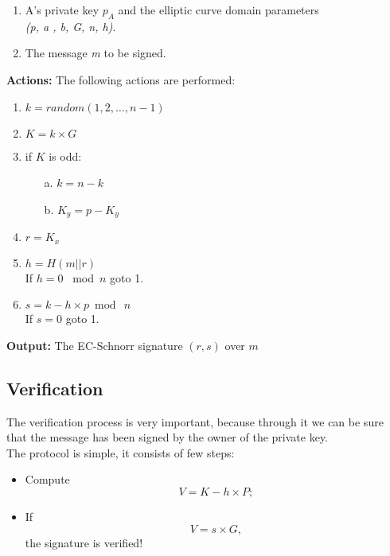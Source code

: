 \hspace{1.1cm}
\begin{minipage}[l]{2\linewidth}
\begin{enumerate}
	\item A's private key  \textit{$p_{A}$} and the elliptic curve domain parameters\\ \textit{(p, a , b, G, n, h)}.
	\item The message \textit{m} to be signed.\\
\end{enumerate}
\end{minipage}


\textbf{Actions:} The following actions are performed:

\hspace{1.2cm}
\begin{minipage}[l]{2\linewidth}
	\begin{enumerate}
		\item $\textit{k}=random({1, 2, \dots, n-1})$
		\item $K=k \times G$
		\item if $K$ is odd:
		\begin{itemize}
		      \item[a.] $k=n-k$
		      \item[b.] $K_{y}=p-K_{y}$
		\end{itemize}
		\item $r=K_{x}$
		\item $h=H(m||r)$\\
		If $h=0$ \ mod\ $n$ goto 1.
		\item $s=k - h \times p \bmod\ n$ \\
		If $s=0$ goto 1.
	\end{enumerate}
\end{minipage}

\textbf{Output:} The EC-Schnorr signature $(r, s)$ over $m$


\subsection{Verification}
The verification process is very important, because through it we can be sure that the message has been signed by the owner of the private key.\\
The protocol is simple, it consists of few steps:
\begin{itemize}
	\item Compute
	\begin{equation}
	\label{eqn:verif1}
	 V = K - h \times P;
	 \end{equation}
	\item If 
	\begin{equation}
	\label{eqn:verif2}
	V = s \times G,
	\end{equation} the signature is verified!
\end{itemize}

